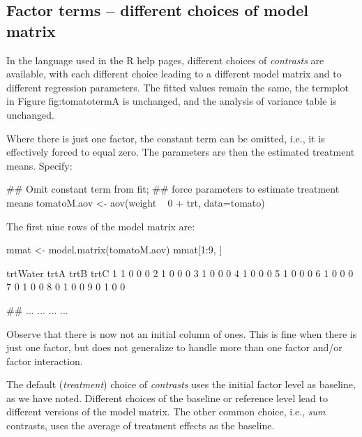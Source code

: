 \subsection{Factor terms -- different choices of model matrix}

In the language used in the R help pages, different choices of
\textit{contrasts} are available, with each different choice leading
to a different model matrix and to different regression parameters.
The fitted values remain the same, the termplot in Figure {fig:tomatoterm}A
is unchanged, and the analysis of variance table is unchanged.

Where there is just one factor, the constant term can be omitted,
i.e., it is effectively forced to equal zero. The parameters are then
the estimated treatment means. Specify:
\begin{Schunk}
\begin{Sinput}
## Omit constant term from fit;
## force parameters to estimate treatment means
tomatoM.aov <- aov(weight ~ 0 + trt, data=tomato)
\end{Sinput}
\end{Schunk}

The first nine rows of the model matrix are:
\begin{Schunk}
\begin{Sinput}
mmat <- model.matrix(tomatoM.aov)
mmat[1:9, ]
\end{Sinput}
\begin{Soutput}
  trtWater trtA trtB trtC
1        1    0    0    0
2        1    0    0    0
3        1    0    0    0
4        1    0    0    0
5        1    0    0    0
6        1    0    0    0
7        0    1    0    0
8        0    1    0    0
9        0    1    0    0
\end{Soutput}
\begin{Sinput}
## ...   ...    ...    ...
\end{Sinput}
\end{Schunk}
Observe that there is now not an initial column of ones.
This is fine when there is just one factor, but does not generalize to
handle more than one factor and/or factor interaction.

The default (\textit{treatment}) choice of \textit{contrasts} uses the
initial factor level as baseline, as we have noted.  Different choices
of the baseline or reference level lead to different versions of the
model matrix.  The other common choice, i.e., \textit{sum} contrasts,
uses the average of treatment effects as the baseline.

